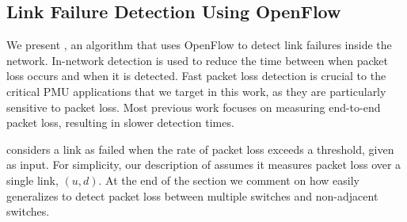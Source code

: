
\subsection{Link Failure Detection Using OpenFlow}
\label{subsec:pcnt}





We present \pcnts, an algorithm that uses OpenFlow to detect link failures inside the network.  In-network detection is used to reduce the time between when packet loss occurs and when it is detected. 
Fast packet loss detection is crucial to the critical PMU applications that we target in this work, as they are particularly sensitive to packet loss. Most previous work \cite{Almes99,Caceres99, 
Friedl09} focuses on measuring end-to-end packet loss, resulting in slower detection times. 

\pcnt considers a link as failed when the rate of packet loss exceeds a threshold, given as input. For simplicity, our description of \pcnt assumes it measures packet loss over a single 
link, $(u,d)$.  At the end of the section we comment on how \pcnt easily generalizes to detect packet loss between multiple switches and non-adjacent switches.  

